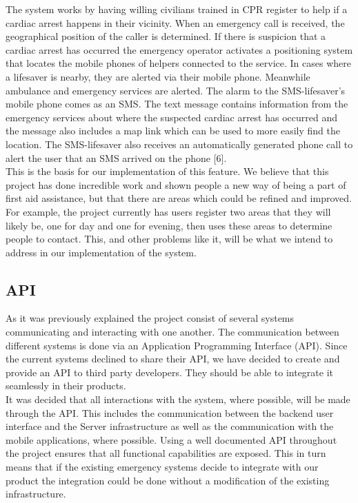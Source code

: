 \documentclass{article}
\begin{document}
The system works by having willing civilians trained in CPR register to help if a cardiac arrest happens in their vicinity. When an emergency call is received, the geographical position of the caller is determined. If there is suspicion that a cardiac arrest has occurred the emergency operator activates a positioning system that locates the mobile phones of helpers connected to the service. In cases where a lifesaver is nearby, they are alerted via their mobile phone. Meanwhile ambulance and emergency services are alerted. The alarm to the SMS-lifesaver’s mobile phone comes as an SMS. The text message contains information from the emergency services about where the suspected cardiac arrest has occurred and the message also includes a map link which can be used to more easily find the location. The SMS-lifesaver also receives an automatically generated phone call to alert the user that an SMS arrived on the phone [6].\\

This is the basis for our implementation of this feature. We believe that this project has done incredible work and shown people a new way of being a part of first aid assistance, but that there are areas which could be refined and improved. For example, the project currently has users register two areas that they will likely be, one for day and one for evening, then uses these areas to determine people to contact. This, and other problems like it, will be what we intend to address in our implementation of the system.\\

    \subsection{API}
    As it was previously explained the project consist of several systems communicating and interacting with one another. The communication between different systems is done via an Application Programming Interface (API). Since the current systems declined to share their API, we have decided to create and provide an API to third party developers. They should be able to integrate it seamlessly in their products.\\

It was decided that all interactions with the system, where possible, will be made through the API. This includes the communication between the backend user interface and the Server infrastructure as well as the communication with the mobile applications, where possible. Using a well documented API throughout the project ensures that all functional capabilities are exposed. This in turn means that if the existing emergency systems decide to integrate with our product the integration could be done without a modification of the existing infrastructure.\\
\end{document}
